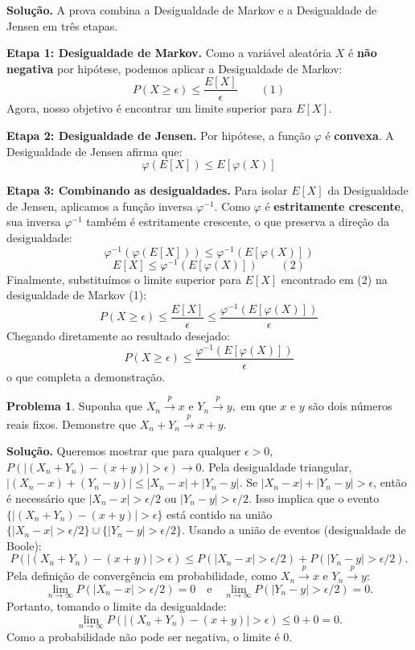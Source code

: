 \documentclass{article}
\theoremstyle{definition}
\newtheorem{problema}{Problema}
\newenvironment{solucao}{\par\noindent\textbf{Solução.}}{\par}
\begin{document}
\begin{solucao}
	A prova combina a Desigualdade de Markov e a Desigualdade de Jensen em três etapas.
	
	\textbf{Etapa 1: Desigualdade de Markov.}
	Como a variável aleatória $X$ é \textbf{não negativa} por hipótese, podemos aplicar a Desigualdade de Markov:
	\[
	P(X \ge \epsilon) \le \frac{E[X]}{\epsilon} \quad \quad (1)
	\]
	Agora, nosso objetivo é encontrar um limite superior para $E[X]$.
	
	\textbf{Etapa 2: Desigualdade de Jensen.}
	Por hipótese, a função $\varphi$ é \textbf{convexa}. A Desigualdade de Jensen afirma que:
	\[
	\varphi(E[X]) \le E[\varphi(X)]
	\]
	
	\textbf{Etapa 3: Combinando as desigualdades.}
	Para isolar $E[X]$ da Desigualdade de Jensen, aplicamos a função inversa $\varphi^{-1}$. Como $\varphi$ é \textbf{estritamente crescente}, sua inversa $\varphi^{-1}$ também é estritamente crescente, o que preserva a direção da desigualdade:
	\[
	\varphi^{-1}(\varphi(E[X])) \le \varphi^{-1}(E[\varphi(X)])
	\]
	\[
	E[X] \le \varphi^{-1}(E[\varphi(X)]) \quad \quad (2)
	\]
	Finalmente, substituímos o limite superior para $E[X]$ encontrado em (2) na desigualdade de Markov (1):
	\[
	P(X \ge \epsilon) \le \frac{E[X]}{\epsilon} \le \frac{\varphi^{-1}(E[\varphi(X)])}{\epsilon}
	\]
	Chegando diretamente ao resultado desejado:
	\[
	P(X \ge \epsilon) \le \frac{\varphi^{-1}(E[\varphi(X)])}{\epsilon}
	\]
	o que completa a demonstração.
\end{solucao}
	\hrulefill
	
	\begin{problema}{}
		Suponha que $X_n \xrightarrow{p} x$ e $Y_n \xrightarrow{p} y,$  em que $x$ e $y$ são dois números reais fixos. Demonstre que $X_n + Y_n \xrightarrow{p} x + y.$
	\end{problema}
	
	\begin{solucao}
		Queremos mostrar que para qualquer $\epsilon > 0$, $P(|(X_n+Y_n)-(x+y)| > \epsilon) \to 0$.
		Pela desigualdade triangular, $|(X_n-x)+(Y_n-y)| \le |X_n-x| + |Y_n-y|$.
		Se $|X_n-x|+|Y_n-y| > \epsilon$, então é necessário que $|X_n-x| > \epsilon/2$ ou $|Y_n-y| > \epsilon/2$.
		Isso implica que o evento $\{|(X_n+Y_n)-(x+y)| > \epsilon\}$ está contido na união $\{|X_n-x| > \epsilon/2\} \cup \{|Y_n-y| > \epsilon/2\}$.
		Usando a união de eventos (desigualdade de Boole):
		\[ P(|(X_n+Y_n)-(x+y)| > \epsilon) \le P(|X_n-x| > \epsilon/2) + P(|Y_n-y| > \epsilon/2). \]
		Pela definição de convergência em probabilidade, como $X_n \xrightarrow{p} x$ e $Y_n \xrightarrow{p} y$:
		\[ \lim_{n \to \infty} P(|X_n-x| > \epsilon/2) = 0 \quad \text{e} \quad \lim_{n \to \infty} P(|Y_n-y| > \epsilon/2) = 0. \]
		Portanto, tomando o limite da desigualdade:
		\[ \lim_{n \to \infty} P(|(X_n+Y_n)-(x+y)| > \epsilon) \le 0 + 0 = 0. \]
		Como a probabilidade não pode ser negativa, o limite é 0.
	\end{solucao}
	
\end{document}
